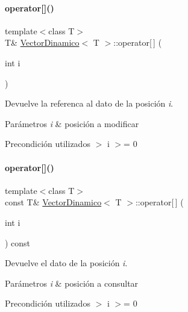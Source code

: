 \paragraph{\texorpdfstring{operator[]()}{operator[]()}\hspace{0.1cm}{\footnotesize\ttfamily [1/2]}}
{\footnotesize\ttfamily template$<$class T$>$ \\
T\& \hyperlink{classVectorDinamico}{Vector\+Dinamico}$<$ T $>$\+::operator\mbox{[}$\,$\mbox{]} (\begin{DoxyParamCaption}\item[{int}]{i }\end{DoxyParamCaption})}



Devuelve la referenca al dato de la posición {\itshape i}. 


\begin{DoxyParams}{Parámetros}
{\em i} & posición a modificar \\
\hline
\end{DoxyParams}
\begin{DoxyPrecond}{Precondición}
utilizados $>$ i $>$= 0 
\end{DoxyPrecond}
\mbox{\label{classVectorDinamico_a49ee059bff7d3443235138fff5611d0a}} 
\paragraph{\texorpdfstring{operator[]()}{operator[]()}\hspace{0.1cm}{\footnotesize\ttfamily [2/2]}}
{\footnotesize\ttfamily template$<$class T$>$ \\
const T\& \hyperlink{classVectorDinamico}{Vector\+Dinamico}$<$ T $>$\+::operator\mbox{[}$\,$\mbox{]} (\begin{DoxyParamCaption}\item[{int}]{i }\end{DoxyParamCaption}) const}



Devuelve el dato de la posición {\itshape i}. 


\begin{DoxyParams}{Parámetros}
{\em i} & posición a consultar \\
\hline
\end{DoxyParams}
\begin{DoxyPrecond}{Precondición}
utilizados $>$ i $>$= 0 
\end{DoxyPrecond}
\mbox{\label{classVectorDinamico_a9b3fd8907bc3ca9b5bc5775bbb11f867}} 
